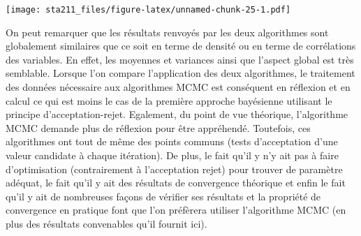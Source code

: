 \documentclass[
]{article}
\newenvironment{Shaded}{\begin{snugshade}}{\end{snugshade}}
\newcommand{\CharTok}[1]{\textcolor[rgb]{0.31,0.60,0.02}{#1}}
\newcommand{\DataTypeTok}[1]{\textcolor[rgb]{0.13,0.29,0.53}{#1}}
\newcommand{\DecValTok}[1]{\textcolor[rgb]{0.00,0.00,0.81}{#1}}
\newcommand{\KeywordTok}[1]{\textcolor[rgb]{0.13,0.29,0.53}{\textbf{#1}}}
\newcommand{\NormalTok}[1]{#1}
\newcommand{\OperatorTok}[1]{\textcolor[rgb]{0.81,0.36,0.00}{\textbf{#1}}}
\newcommand{\StringTok}[1]{\textcolor[rgb]{0.31,0.60,0.02}{#1}}
\begin{document}
\begin{Shaded}
\end{Shaded}

\texttt{[image: sta211\_files/figure-latex/unnamed-chunk-25-1.pdf]}

On peut remarquer que les résultats renvoyés par les deux algorithmes
sont globalement similaires que ce soit en terme de densité ou en terme
de corrélations des variables. En effet, les moyennes et variances ainsi
que l'aspect global est très semblable. Lorsque l'on compare
l'application des deux algorithmes, le traitement des données nécessaire
aux algorithmes MCMC est conséquent en réflexion et en calcul ce qui est
moins le cas de la première approche bayésienne utilisant le principe
d'acceptation-rejet. Egalement, du point de vue théorique, l'algorithme
MCMC demande plus de réflexion pour être appréhendé. Toutefois, ces
algorithmes ont tout de même des points communs (tests d'acceptation
d'une valeur candidate à chaque itération). De plus, le fait qu'il y n'y
ait pas à faire d'optimisation (contrairement à l'acceptation rejet)
pour trouver de paramètre adéquat, le fait qu'il y ait des résultats de
convergence théorique et enfin le fait qu'il y ait de nombreuses façons
de vérifier ses résultats et la propriété de convergence en pratique
font que l'on préfèrera utiliser l'algorithme MCMC (en plus des
résultats convenables qu'il fournit ici).
\end{document}

